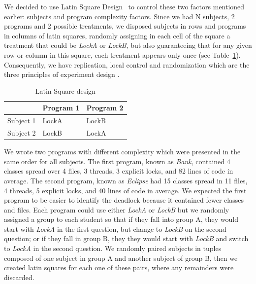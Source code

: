 We decided to use Latin Square Design~\citep{box} to control these two factors mentioned earlier: subjects and program complexity factors.
Since we had N subjects, 2 programs and 2 possible treatments, we disposed subjects in rows and programs in columns of latin squares,
randomly assigning in each cell of the square a treatment that could be \emph{LockA} or \emph{LockB},
but also guaranteeing that for any given row or column in this square,
each treatment appears only once (see Table~\ref{tab:latin}).
Consequently, we have replication, local control and randomization which are the three principles of experiment design \citep{box}.

\begin{table}
\begin{center}
\caption{Latin Square design}\label{tab:latin}
\begin{tabular}{|l|l|l|}
\hline
 & Program 1 & Program 2\\
\hline
Subject 1 & LockA & LockB\\
Subject 2 & LockB & LockA\\
\hline
\end{tabular}
\end{center}
\end{table}

We wrote two programs with different complexity which were presented in the same order for all subjects.
The first program, known as \emph{Bank}, contained 4 classes spread over 4 files, 3 threads, 3 explicit locks, and 82 lines of code in average.
The second program, known as \emph{Eclipse} had 15 classes spread in 11 files, 4 threads, 5 explicit locks, and 40 lines of code in average.
We expected the first program to be easier to identify the deadlock because it contained fewer classes and files.
Each program could use either \emph{LockA} or \emph{LockB} but we randomly assigned a group to each student so that if they fall into group A,
they would start with \emph{LockA} in the first question, but change to \emph{LockB} on the second question;
or if they fall in group B, they they would start with \emph{LockB} and switch to \emph{LockA} in the second question.
We randomly paired subjects in tuples composed of one subject in group A and another subject of group B,
then we created latin squares for each one of these pairs, where any remainders were discarded.


